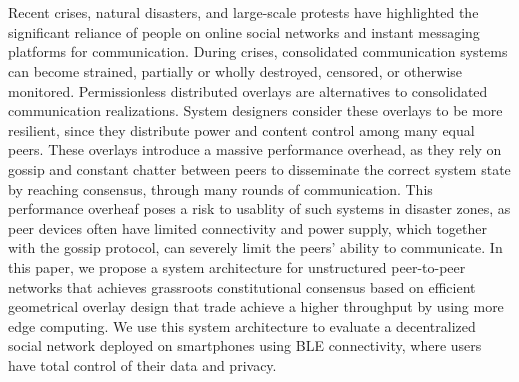 \chapter{\abstractname}
Recent crises, natural disasters, and large-scale protests have highlighted the significant reliance of people on online social networks and instant messaging platforms for communication.
During crises, consolidated communication systems can become strained, partially or wholly destroyed, censored, or otherwise monitored.
Permissionless distributed overlays are alternatives to consolidated communication realizations.
System designers consider these overlays to be more resilient, since they distribute power and content control among many equal peers.
These overlays introduce a massive performance overhead, as they rely on gossip and constant chatter between peers to disseminate the correct system state by reaching consensus, through many rounds of communication.
This performance overheaf poses a risk to usablity of such systems in disaster zones, as peer devices often have limited connectivity and power supply, which together with the gossip protocol, can severely limit the peers' ability to communicate.
In this paper, we propose a system architecture for unstructured peer-to-peer networks that achieves grassroots constitutional consensus based on efficient geometrical overlay design that trade achieve a higher throughput by using more edge computing.
We use this system architecture to evaluate a decentralized social network deployed on smartphones using BLE connectivity, where users have total control of their data and privacy.




\makeatletter
{}
{\renewcommand{\abstractname}{Kurzfassung}}
{\renewcommand{\abstractname}{Abstract}}
\makeatother

\chapter{\abstractname}

\begin{otherlanguage}{ngerman} %

\end{otherlanguage}


\makeatletter
{}
{\renewcommand{\abstractname}{Abstract}}
{\renewcommand{\abstractname}{Kurzfassung}}
\makeatother